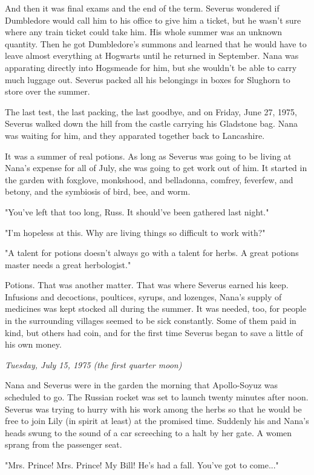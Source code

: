 \documentclass[a4paper,11pt]{article}
\begin{document}
And then it was final exams and the end of the term. Severus wondered if Dumbledore would call him to his office to give him a ticket, but he wasn't sure where any train ticket could take him. His whole summer was an unknown quantity. Then he got Dumbledore's summons and learned that he would have to leave almost everything at Hogwarts until he returned in September. Nana was apparating directly into Hogsmeade for him, but she wouldn't be able to carry much luggage out. Severus packed all his belongings in boxes for Slughorn to store over the summer.

The last test, the last packing, the last goodbye, and on Friday, June 27, 1975, Severus walked down the hill from the castle carrying his Gladstone bag. Nana was waiting for him, and they apparated together back to Lancashire.

It was a summer of real potions. As long as Severus was going to be living at Nana's expense for all of July, she was going to get work out of him. It started in the garden with foxglove, monkshood, and belladonna, comfrey, feverfew, and betony, and the symbiosis of bird, bee, and worm.

"You've left that too long, Russ. It should've been gathered last night."

"I'm hopeless at this. Why are living things so difficult to work with?"

"A talent for potions doesn't always go with a talent for herbs. A great potions master needs a great herbologist."

Potions. That was another matter. That was where Severus earned his keep. Infusions and decoctions, poultices, syrups, and lozenges, Nana's supply of medicines was kept stocked all during the summer. It was needed, too, for people in the surrounding villages seemed to be sick constantly. Some of them paid in kind, but others had coin, and for the first time Severus began to save a little of his own money.

\emph{Tuesday, July 15, 1975 (the first quarter moon)}

Nana and Severus were in the garden the morning that Apollo-Soyuz was scheduled to go. The Russian rocket was set to launch twenty minutes after noon. Severus was trying to hurry with his work among the herbs so that he would be free to join Lily (in spirit at least) at the promised time. Suddenly his and Nana's heads swung to the sound of a car screeching to a halt by her gate. A women sprang from the passenger seat.

"Mrs. Prince! Mrs. Prince! My Bill! He's had a fall. You've got to come..."
\end{document}
